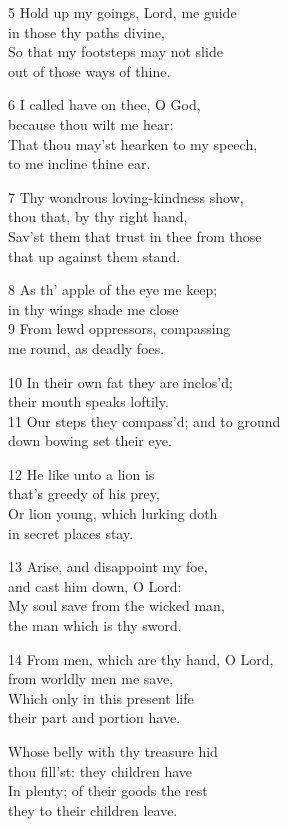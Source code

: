 5 Hold up my goings, Lord, me guide\\
in those thy paths divine,\\
So that my footsteps may not slide\\
out of those ways of thine.

6 I called have on thee, O God,\\
because thou wilt me hear:\\
That thou may’st hearken to my speech,\\
to me incline thine ear.

7 Thy wondrous loving-kindness show,\\
thou that, by thy right hand,\\
Sav’st them that trust in thee from those\\
that up against them stand.

8 As th’ apple of the eye me keep;\\
in thy wings shade me close\\
9 From lewd oppressors, compassing\\
me round, as deadly foes.

10 In their own fat they are inclos’d;\\
their mouth speaks loftily.\\
11 Our steps they compass’d; and to ground\\
down bowing set their eye.

12 He like unto a lion is\\
that’s greedy of his prey,\\
Or lion young, which lurking doth\\
in secret places stay.

13 Arise, and disappoint my foe,\\
and cast him down, O Lord:\\
My soul save from the wicked man,\\
the man which is thy sword.

14 From men, which are thy hand, O Lord,\\
from worldly men me save,\\
Which only in this present life\\
their part and portion have.

Whose belly with thy treasure hid\\
thou fill’st: they children have\\
In plenty; of their goods the rest\\
they to their children leave.

